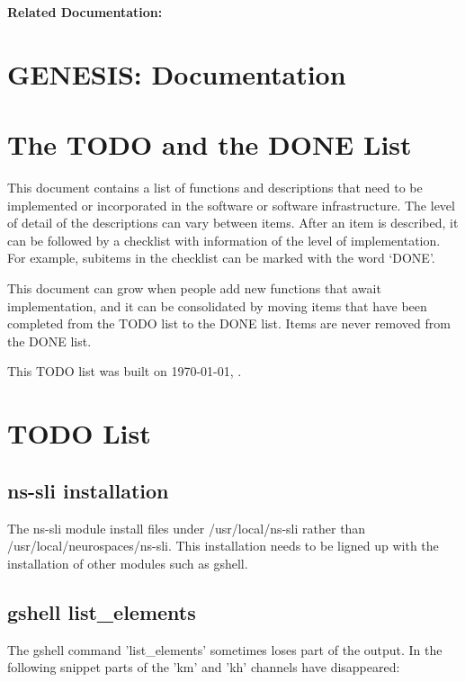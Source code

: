 \documentclass[12pt]{article}
\begin{document}
{\bf Related Documentation:}

\section*{GENESIS: Documentation}

\section{The TODO and the DONE List}

This document contains a list of functions and descriptions that need
to be implemented or incorporated in the software or software
infrastructure.  The level of detail of the descriptions can vary
between items.  After an item is described, it can be followed by a
checklist with information of the level of implementation.  For
example, subitems in the checklist can be marked with the word `DONE'.

This document can grow when people add new functions that await
implementation, and it can be consolidated by moving items that have
been completed from the TODO list to the DONE list.  Items are never
removed from the DONE list.

This TODO list was built on \today, \thistime.


\section{TODO List}

\subsection{ns-sli installation}

The ns-sli module install files under /usr/local/ns-sli rather than
/usr/local/neurospaces/ns-sli.  This installation needs to be ligned
up with the installation of other modules such as gshell.

\subsection{gshell list\_elements}

The gshell command 'list\_elements' sometimes loses part of the
output.  In the following snippet parts of the 'km' and 'kh' channels
have disappeared:
\end{document}
